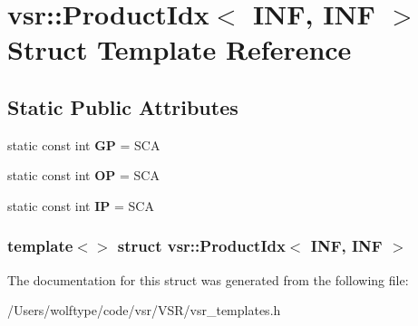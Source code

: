 \hypertarget{structvsr_1_1_product_idx_3_01_i_n_f_00_01_i_n_f_01_4}{\section{vsr\-:\-:Product\-Idx$<$ I\-N\-F, I\-N\-F $>$ Struct Template Reference}
\label{structvsr_1_1_product_idx_3_01_i_n_f_00_01_i_n_f_01_4}
}
\subsection*{Static Public Attributes}
\begin{DoxyCompactItemize}
\item 
\hypertarget{structvsr_1_1_product_idx_3_01_i_n_f_00_01_i_n_f_01_4_a65289da3c80033a0271a742ef5af9fae}{static const int {\bfseries G\-P} = S\-C\-A}\label{structvsr_1_1_product_idx_3_01_i_n_f_00_01_i_n_f_01_4_a65289da3c80033a0271a742ef5af9fae}

\item 
\hypertarget{structvsr_1_1_product_idx_3_01_i_n_f_00_01_i_n_f_01_4_a7d48de83726bd2d688a7884820148041}{static const int {\bfseries O\-P} = S\-C\-A}\label{structvsr_1_1_product_idx_3_01_i_n_f_00_01_i_n_f_01_4_a7d48de83726bd2d688a7884820148041}

\item 
\hypertarget{structvsr_1_1_product_idx_3_01_i_n_f_00_01_i_n_f_01_4_a71886dc27a1d78e886aaf797e9918f8a}{static const int {\bfseries I\-P} = S\-C\-A}\label{structvsr_1_1_product_idx_3_01_i_n_f_00_01_i_n_f_01_4_a71886dc27a1d78e886aaf797e9918f8a}

\end{DoxyCompactItemize}
\subsubsection*{template$<$$>$ struct vsr\-::\-Product\-Idx$<$ I\-N\-F, I\-N\-F $>$}



The documentation for this struct was generated from the following file\-:\begin{DoxyCompactItemize}
\item 
/\-Users/wolftype/code/vsr/\-V\-S\-R/vsr\-\_\-templates.\-h\end{DoxyCompactItemize}
